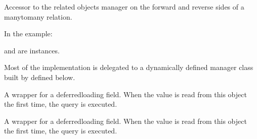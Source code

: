 \documentclass[letterpaper,10pt,spanish]{sphinxmanual}
\begin{document}
\begin{fulllineitems}
\begin{fulllineitems}

\pysigstartsignatures
{}
\pysigstopsignatures
\sphinxAtStartPar
Accessor to the related objects manager on the forward and reverse sides of
a many\sphinxhyphen{}to\sphinxhyphen{}many relation.

\sphinxAtStartPar
In the example:

\begin{sphinxVerbatim}[commandchars=\\\{\}]
 
       
\end{sphinxVerbatim}

\sphinxAtStartPar
{} and  are 
instances.

\sphinxAtStartPar
Most of the implementation is delegated to a dynamically defined manager
class built by  defined below.

\end{fulllineitems}



\begin{fulllineitems}

\pysigstartsignatures
{}
\pysigstopsignatures
\sphinxAtStartPar
A wrapper for a deferred\sphinxhyphen{}loading field. When the value is read from this
object the first time, the query is executed.

\end{fulllineitems}



\begin{fulllineitems}

\pysigstartsignatures
{}
\pysigstopsignatures
\sphinxAtStartPar
A wrapper for a deferred\sphinxhyphen{}loading field. When the value is read from this
object the first time, the query is executed.

\end{fulllineitems}




\end{fulllineitems}
\end{document}
